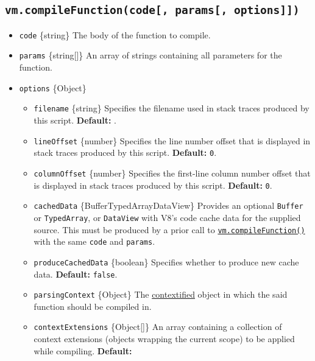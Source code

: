 \subsection{\texorpdfstring{\texttt{vm.compileFunction(code{[},\ params{[},\ options{]}{]})}}{vm.compileFunction(code{[}, params{[}, options{]}{]})}}\label{vm.compilefunctioncode-params-options}

\begin{itemize}
\tightlist
\item
  \texttt{code} \{string\} The body of the function to compile.
\item
  \texttt{params} \{string{[}{]}\} An array of strings containing all
  parameters for the function.
\item
  \texttt{options} \{Object\}

  \begin{itemize}
  \tightlist
  \item
    \texttt{filename} \{string\} Specifies the filename used in stack
    traces produced by this script. \textbf{Default:}
    \texttt{\textquotesingle{}\textquotesingle{}}.
  \item
    \texttt{lineOffset} \{number\} Specifies the line number offset that
    is displayed in stack traces produced by this script.
    \textbf{Default:} \texttt{0}.
  \item
    \texttt{columnOffset} \{number\} Specifies the first-line column
    number offset that is displayed in stack traces produced by this
    script. \textbf{Default:} \texttt{0}.
  \item
    \texttt{cachedData} \{Buffer\textbar TypedArray\textbar DataView\}
    Provides an optional \texttt{Buffer} or \texttt{TypedArray}, or
    \texttt{DataView} with V8's code cache data for the supplied source.
    This must be produced by a prior call to
    \hyperref[vmcompilefunctioncode-params-options]{\texttt{vm.compileFunction()}}
    with the same \texttt{code} and \texttt{params}.
  \item
    \texttt{produceCachedData} \{boolean\} Specifies whether to produce
    new cache data. \textbf{Default:} \texttt{false}.
  \item
    \texttt{parsingContext} \{Object\} The
    \hyperref[what-does-it-mean-to-contextify-an-object]{contextified}
    object in which the said function should be compiled in.
  \item
    \texttt{contextExtensions} \{Object{[}{]}\} An array containing a
    collection of context extensions (objects wrapping the current
    scope) to be applied while compiling. \textbf{Default:}

\end{itemize}
\end{itemize}
